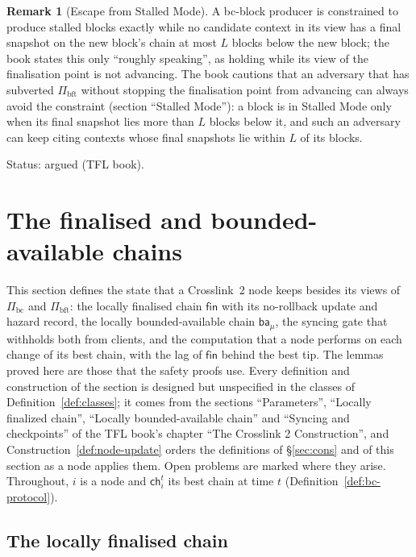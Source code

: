 \documentclass[11pt,a4paper]{article}
\theoremstyle{definition}
\newtheorem{remark}[theorem]{Remark}
\newcommand{\bc}{\mathrm{bc}}
\newcommand{\bft}{\mathrm{bft}}
\newcommand{\ch}{\mathsf{ch}}
\newcommand{\Pibc}{\Pi_{\bc}}
\newcommand{\Pibft}{\Pi_{\bft}}
\newcommand{\fin}{\mathsf{fin}}
\newcommand{\ba}{\mathsf{ba}}
\begin{document}
\begin{remark}[Escape from Stalled Mode]\label{rem:escape}
A bc-block producer is constrained to produce stalled blocks exactly while no
candidate context in its view has a final snapshot on the new block's chain
at most $L$ blocks below the new block; the book states this only ``roughly
speaking'', as holding while its view of the finalisation point is not
advancing. The book cautions that an adversary that has subverted $\Pibft$
without stopping the finalisation point from advancing can always avoid the
constraint (section ``Stalled Mode''): a block is in Stalled Mode only when its
final snapshot lies more than $L$ blocks below it, and such an adversary can
keep citing contexts whose final snapshots lie within $L$ of its blocks.

Status: argued (TFL book).
\end{remark}

\section{The finalised and bounded-available chains}\label{sec:ledgers}

This section defines the state that a Crosslink~2 node keeps besides its
views of $\Pibc$ and $\Pibft$: the locally finalised chain $\fin$ with its
no-rollback update and hazard record, the locally bounded-available chain
$\ba_\mu$, the syncing gate that withholds both from clients, and the
computation that a node performs on each change of its best chain, with the
lag of $\fin$ behind the best tip. The lemmas proved here are those that the
safety proofs use. Every definition and construction of the section is
designed but unspecified in the classes of Definition~\ref{def:classes}; it
comes from the sections ``Parameters'', ``Locally finalized chain'',
``Locally bounded-available chain'' and ``Syncing and checkpoints'' of the
TFL book's chapter ``The Crosslink 2 Construction'', and
Construction~\ref{def:node-update} orders the definitions of
\S\ref{sec:cons} and of this section as a node applies them. Open problems are
marked where they arise. Throughout, $i$ is a node and $\ch_i^t$ its best chain
at time $t$ (Definition~\ref{def:bc-protocol}).

\subsection{The locally finalised chain}\label{sec:led-fin}
\end{document}
